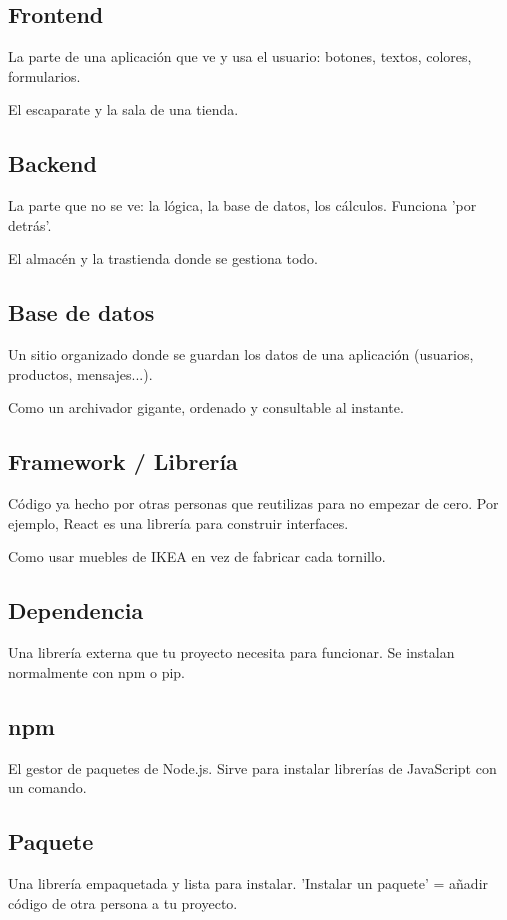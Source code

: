 \documentclass[11pt,a4paper]{book}
\begin{document}
\subsection{Frontend}
La parte de una aplicación que ve y usa el usuario: botones, textos, colores, formularios.

El escaparate y la sala de una tienda.

\subsection{Backend}
La parte que no se ve: la lógica, la base de datos, los cálculos. Funciona 'por detrás'.

El almacén y la trastienda donde se gestiona todo.

\subsection{Base de datos}
Un sitio organizado donde se guardan los datos de una aplicación (usuarios, productos, mensajes...).

Como un archivador gigante, ordenado y consultable al instante.

\subsection{Framework / Librería}
Código ya hecho por otras personas que reutilizas para no empezar de cero. Por ejemplo, React es una librería para construir interfaces.

Como usar muebles de IKEA en vez de fabricar cada tornillo.

\subsection{Dependencia}
Una librería externa que tu proyecto necesita para funcionar. Se instalan normalmente con npm o pip.

\subsection{npm}
El gestor de paquetes de Node.js. Sirve para instalar librerías de JavaScript con un comando.

\subsection{Paquete}
Una librería empaquetada y lista para instalar. 'Instalar un paquete' = añadir código de otra persona a tu proyecto.
\end{document}
